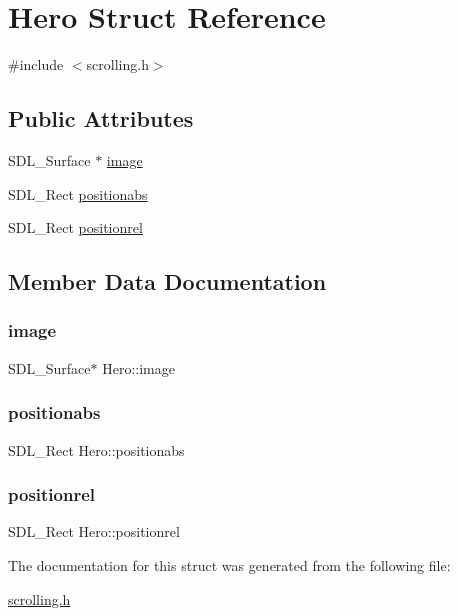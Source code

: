 \hypertarget{structHero}{}\section{Hero Struct Reference}
\label{structHero}


{\ttfamily \#include $<$scrolling.\+h$>$}

\subsection*{Public Attributes}
\begin{DoxyCompactItemize}
\item 
S\+D\+L\+\_\+\+Surface $\ast$ \hyperlink{structHero_a3770973cf39e7634c1d98327508ca4e6}{image}
\item 
S\+D\+L\+\_\+\+Rect \hyperlink{structHero_aa504d40bc830a12f6628b23d2014bea8}{positionabs}
\item 
S\+D\+L\+\_\+\+Rect \hyperlink{structHero_a6b44138ca819122a0a7a52d1b5cbba54}{positionrel}
\end{DoxyCompactItemize}


\subsection{Member Data Documentation}
\mbox{\label{structHero_a3770973cf39e7634c1d98327508ca4e6}} 
\subsubsection{\texorpdfstring{image}{image}}
{\footnotesize\ttfamily S\+D\+L\+\_\+\+Surface$\ast$ Hero\+::image}

\mbox{\label{structHero_aa504d40bc830a12f6628b23d2014bea8}} 
\subsubsection{\texorpdfstring{positionabs}{positionabs}}
{\footnotesize\ttfamily S\+D\+L\+\_\+\+Rect Hero\+::positionabs}

\mbox{\label{structHero_a6b44138ca819122a0a7a52d1b5cbba54}} 
\subsubsection{\texorpdfstring{positionrel}{positionrel}}
{\footnotesize\ttfamily S\+D\+L\+\_\+\+Rect Hero\+::positionrel}



The documentation for this struct was generated from the following file\+:\begin{DoxyCompactItemize}
\item 
\hyperlink{scrolling_8h}{scrolling.\+h}\end{DoxyCompactItemize}
